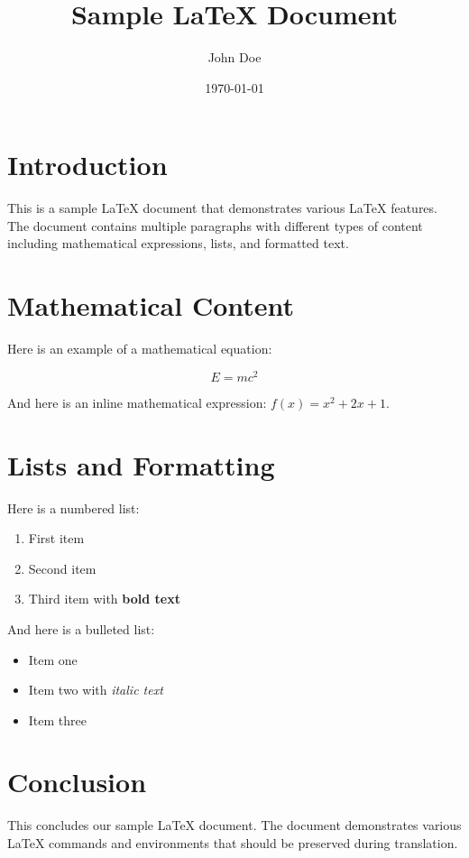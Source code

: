 \documentclass{article}
\title{Sample LaTeX Document}
\author{John Doe}
\date{\today}
\begin{document}
\maketitle

\section{Introduction}

This is a sample LaTeX document that demonstrates various LaTeX features. The document contains multiple paragraphs with different types of content including mathematical expressions, lists, and formatted text.

\section{Mathematical Content}

Here is an example of a mathematical equation:

\begin{equation}
E = mc^2
\end{equation}

And here is an inline mathematical expression: $f(x) = x^2 + 2x + 1$.

\section{Lists and Formatting}

Here is a numbered list:

\begin{enumerate}
    \item First item
    \item Second item
    \item Third item with \textbf{bold text}
\end{enumerate}

And here is a bulleted list:

\begin{itemize}
    \item Item one
    \item Item two with \textit{italic text}
    \item Item three
\end{itemize}

\section{Conclusion}

This concludes our sample LaTeX document. The document demonstrates various LaTeX commands and environments that should be preserved during translation.
\end{document}
